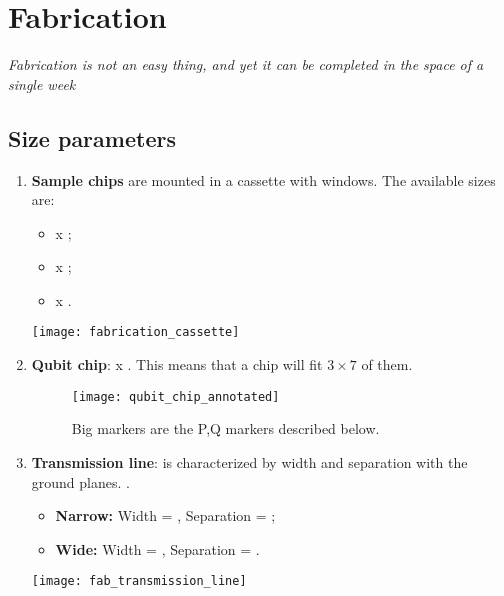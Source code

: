 
\section{Fabrication}
\label{sec:fabrication}

\textit{Fabrication is not an easy thing, and yet it can be completed in the space of a single
  week}

\subsection{Size parameters}\label{sec:size-parameters}
\begin{enumerate}
\item \textbf{Sample chips} are mounted in a cassette with windows. The available sizes are:

  \begin{itemize}
  \item {} x ;
  \item {} x ;
  \item {} x .
  \end{itemize}

  \begin{center}
    \texttt{[image: fabrication\_cassette]}
  \end{center}
  
  \noindent {}\ec

\item \textbf{Qubit  chip}:  x  .  This means that  a 
  chip will fit $ 3\times7 $ of them.

  \begin{figure}[h]
    \centering \texttt{[image: qubit\_chip\_annotated]}
    \caption{\small Big markers are the P,Q markers described below.\label{fig:qubit_chip}}
  \end{figure}

  \noindent

\item \textbf{Transmission  line}: is characterized  by width  and separation with  the ground
  planes. \ec.

  \begin{itemize}
  \item \textbf{Narrow:} Width = , Separation = ;
  \item \textbf{Wide:} Width = , Separation = .
  \end{itemize}

   \begin{center}
     \texttt{[image: fab\_transmission\_line]}
   \end{center}

 
 \end{enumerate}

